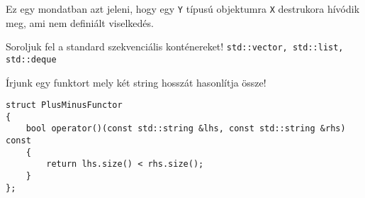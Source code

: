 \documentclass[a4paper,11.5pt]{article}
\begin{document}
	Ez egy mondatban azt jeleni, hogy egy \texttt{Y} típusú objektumra \texttt{X} destrukora hívódik meg, ami nem definiált viselkedés.
	\bigskip
	
	Soroljuk fel a standard szekvenciális konténereket! \texttt{std::vector, std::list, std::deque}
	\bigskip
	
	 Írjunk egy funktort mely két string hosszát hasonlítja össze!
	\begin{lstlisting}
struct PlusMinusFunctor
{
	bool operator()(const std::string &lhs, const std::string &rhs) const
	{
		return lhs.size() < rhs.size();
	}
};
		\end{lstlisting}
\end{document}
